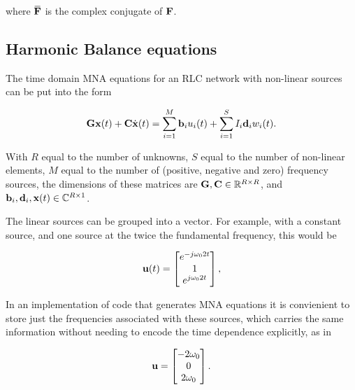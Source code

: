 \documentclass[12pt,journal,compsoc]{../ieeepaper/IEEEtran}
\begin{document}
where \( \overbar{\BF} \) is the complex conjugate of \( \mathbf{F} \).


\subsection{Harmonic Balance equations}

The time domain MNA equations for an RLC network with non-linear sources can be put into the form

\begin{equation}\label{eqn:ece1254projectReport:420}
\BG \Bx(t) + \BC \dot{\Bx}(t) = \sum_{i = 1}^M \Bb_i u_i(t) + \sum_{i = 1}^S I_i \Bd_i w_i(t).
\end{equation}

With \( R \) equal to the number of unknowns, \( S \) equal to the number of non-linear elements, \( M \) equal to the number of (positive, negative and zero) frequency sources, the dimensions of these matrices are \( \mathbf{G}, \mathbf{C} \in \text{$\mathbb{R}^{R \times R}$} \), and \( \mathbf{b}_i, \mathbf{d}_i, \mathbf{x}(t) \in \text{$\mathbb{C}^{R \times 1}$} \).

The linear sources can be grouped into a vector.  For example, with a constant source, and one source at the twice the fundamental frequency, this would be

\begin{equation}\label{eqn:ece1254projectReport:440}
\Bu(t) = 
\begin{bmatrix}
e^{ -j \omega_0 2 t } \\
1 \\
e^{ j \omega_0 2 t }
\end{bmatrix},
\end{equation}

In an implementation of code that generates MNA equations it is convienient to store just the frequencies associated with these sources, which carries the same information without needing to encode the time dependence explicitly, as in

\begin{equation}\label{eqn:ece1254projectReport:460}
\Bu =
\begin{bmatrix}
- 2 \omega_0 \\
0 \\
2 \omega_0 
\end{bmatrix}.
\end{equation}
\end{document}
